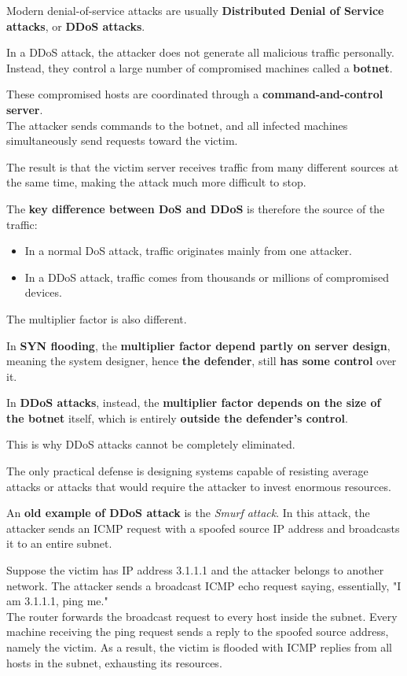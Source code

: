 \documentclass{article}
\begin{document}
Modern denial-of-service attacks are usually \textbf{Distributed Denial of Service attacks}, or \textbf{DDoS attacks}.

In a DDoS attack, the attacker does not generate all malicious traffic personally. Instead, they control a large number of compromised machines called a \textbf{botnet}.

These compromised hosts are coordinated through a \textbf{command-and-control server}.\\
The attacker sends commands to the botnet, and all infected machines simultaneously send requests toward the victim.

The result is that the victim server receives traffic from many different sources at the same time, making the attack much more difficult to stop.

The \textbf{key difference between DoS and DDoS} is therefore the source of the traffic:

\begin{itemize}
\item In a normal DoS attack, traffic originates mainly from one attacker.
\item In a DDoS attack, traffic comes from thousands or millions of compromised devices.
\end{itemize}

The multiplier factor is also different.

In \textbf{SYN flooding}, the \textbf{multiplier factor depend partly on server design}, meaning the system designer, hence \textbf{the defender}, still \textbf{has some control} over it.

In \textbf{DDoS attacks}, instead, the \textbf{multiplier factor depends on the size of the botnet} itself, which is entirely \textbf{outside the defender's control}.

This is why DDoS attacks cannot be completely eliminated.

The only practical defense is designing systems capable of resisting average attacks or attacks that would require the attacker to invest enormous resources.

An \textbf{old example of DDoS attack} is the \textit{Smurf attack}. In this attack, the attacker sends an ICMP request with a spoofed source IP address and broadcasts it to an entire subnet.

Suppose the victim has IP address 3.1.1.1 and the attacker belongs to another network. The attacker sends a broadcast ICMP echo request saying, essentially, "I am 3.1.1.1, ping me."\\
The router forwards the broadcast request to every host inside the subnet. Every machine receiving the ping request sends a reply to the spoofed source address, namely the victim. As a result, the victim is flooded with ICMP replies from all hosts in the subnet, exhausting its resources.
\end{document}
